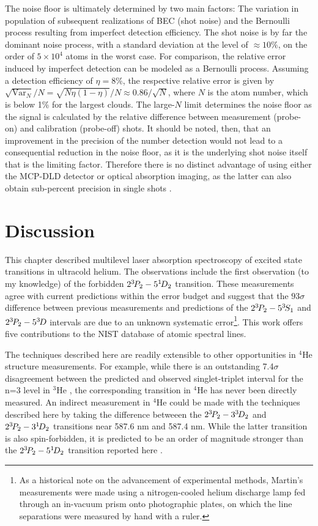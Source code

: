	The noise floor is ultimately determined by two main factors: The variation in population of subsequent realizations of BEC (shot noise) and the Bernoulli process resulting from imperfect detection efficiency.
	The shot noise is by far the dominant noise process, with a standard deviation at the level of $\approx 10\%$, on the order of $5\times10^4$ atoms in the worst case. 
	For comparison, the relative error induced by imperfect detection can be modeled as a Bernoulli process. 
	Assuming a detection efficiency of $\eta=8\%$, the respective relative error is given by $\sqrt{\textrm{Var}_N}/N=\sqrt{N\eta(1-\eta)}/N\approx0.86/\sqrt{N}$, where $N$ is the atom number, which is below 1\% for the largest clouds. 
	The large-$N$ limit determines the noise floor as the signal is calculated by the relative difference between measurement (probe-on) and calibration (probe-off) shots.
	It should be noted, then, that an improvement in the precision of the number detection would not lead to a consequential reduction in the noise floor, as it is the underlying shot noise itself that is the limiting factor.
	Therefore there is no distinct advantage of using either the MCP-DLD detector or optical absorption imaging, as the latter can also obtain sub-percent precision in single shots \cite{Ockeloen10}.


\section{Discussion}

	This chapter described multilevel laser absorption spectroscopy of excited state transitions in ultracold helium.
	The observations include the first observation (to my knowledge) of the forbidden $2^{3\!} P_2 - 5^{1\!} D_2$ transition.
	These measurements agree with current predictions within the error budget and suggest that the $93\sigma$ difference between previous measurements \cite{Martin60} and predictions \cite{Morton06} of the $2^{3\!}P_2  -  5^{3\!}S_{1}$ and $2^{3\!}P_2  -  5^{3\!}D$ intervals are due to an unknown systematic error\footnote{As a historical note on the advancement of experimental methods, Martin's measurements were made using a nitrogen-cooled helium discharge lamp fed through an in-vacuum prism onto photographic plates, on which the line separations were measured by hand with a ruler.}.
	This work offers five contributions to the NIST database of atomic spectral lines.

	The techniques described here are readily extensible to other opportunities in $^4$He structure measurements.
	For example, while there is an outstanding 7.4$\sigma$ disagreement between the predicted and observed singlet-triplet interval for the n=3 level in $^3$He \cite{Morton06,Derouard80}, the corresponding transition in $^4$He has never been directly measured.
	An indirect measurement in $^4$He could be made with the techniques described here by taking the difference betweeen the $2^{3\!} P_2 - 3^{3\!} D_2$ and $2^{3\!} P_2 - 3^{1\!} D_2$ transitions near 587.6 nm and 587.4 nm.
	While the latter transition is also spin-forbidden, it is predicted to be an order of magnitude stronger than the $2^{3\!} P_2 - 5^{1\!} D_2$ transition reported here \cite{Morton06}.

